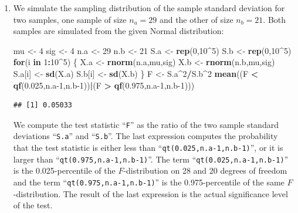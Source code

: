 \documentclass[
]{krantz}
\makeatletter
\newenvironment{Shaded}{\begin{snugshade}}{\end{snugshade}}
\newcommand{\ControlFlowTok}[1]{\textcolor[rgb]{0.13,0.29,0.53}{\textbf{#1}}}
\newcommand{\DecValTok}[1]{\textcolor[rgb]{0.00,0.00,0.81}{#1}}
\newcommand{\FloatTok}[1]{\textcolor[rgb]{0.00,0.00,0.81}{#1}}
\newcommand{\KeywordTok}[1]{\textcolor[rgb]{0.13,0.29,0.53}{\textbf{#1}}}
\newcommand{\NormalTok}[1]{#1}
\newcommand{\OperatorTok}[1]{\textcolor[rgb]{0.81,0.36,0.00}{\textbf{#1}}}
\newcommand{\StringTok}[1]{\textcolor[rgb]{0.31,0.60,0.02}{#1}}
\newenvironment{kframe}{%
\medskip{}
\setlength{\fboxsep}{.8em}
 \def\at@end@of@kframe{}%
 \ifinner\ifhmode%
  \def\at@end@of@kframe{\end{minipage}}%
  \begin{minipage}{\columnwidth}%
 \fi\fi%
 \def\FrameCommand##1{\hskip\@totalleftmargin \hskip-\fboxsep
 \colorbox{shadecolor}{##1}\hskip-\fboxsep
     \hskip-\linewidth \hskip-\@totalleftmargin \hskip\columnwidth}%
 \MakeFramed {\advance\hsize-\width
   \@totalleftmargin\z@ \linewidth\hsize
   \@setminipage}}%
 {\par\unskip\endMakeFramed%
 \at@end@of@kframe}
\renewenvironment{Shaded}{\begin{kframe}}{\end{kframe}}
\theoremstyle{definition}
\theoremstyle{definition}
\theoremstyle{definition}
\theoremstyle{remark}
\makeatother
\begin{document}
\begin{enumerate}
\def\labelenumi{\arabic{enumi}.}
\item
  We simulate the sampling distribution
  of the sample standard deviation for two samples, one sample of size
  \(n_a = 29\) and the other of size \(n_b=21\). Both samples are simulated
  from the given Normal distribution:

\begin{Shaded}
\begin{Highlighting}[]
\NormalTok{mu <-}\StringTok{ }\DecValTok{4}
\NormalTok{sig <-}\StringTok{ }\DecValTok{4}
\NormalTok{n.a <-}\StringTok{ }\DecValTok{29}
\NormalTok{n.b <-}\StringTok{ }\DecValTok{21}
\NormalTok{S.a <-}\StringTok{ }\KeywordTok{rep}\NormalTok{(}\DecValTok{0}\NormalTok{,}\DecValTok{10}\OperatorTok{^}\DecValTok{5}\NormalTok{)}
\NormalTok{S.b <-}\StringTok{ }\KeywordTok{rep}\NormalTok{(}\DecValTok{0}\NormalTok{,}\DecValTok{10}\OperatorTok{^}\DecValTok{5}\NormalTok{)}
\ControlFlowTok{for}\NormalTok{(i }\ControlFlowTok{in} \DecValTok{1}\OperatorTok{:}\DecValTok{10}\OperatorTok{^}\DecValTok{5}\NormalTok{) \{}
\NormalTok{  X.a <-}\StringTok{ }\KeywordTok{rnorm}\NormalTok{(n.a,mu,sig)}
\NormalTok{  X.b <-}\StringTok{ }\KeywordTok{rnorm}\NormalTok{(n.b,mu,sig)}
\NormalTok{  S.a[i] <-}\StringTok{ }\KeywordTok{sd}\NormalTok{(X.a)}
\NormalTok{  S.b[i] <-}\StringTok{ }\KeywordTok{sd}\NormalTok{(X.b)}
\NormalTok{\}}
\NormalTok{F <-}\StringTok{ }\NormalTok{S.a}\OperatorTok{^}\DecValTok{2}\OperatorTok{/}\NormalTok{S.b}\OperatorTok{^}\DecValTok{2}
\KeywordTok{mean}\NormalTok{((F }\OperatorTok{<}\StringTok{ }\KeywordTok{qf}\NormalTok{(}\FloatTok{0.025}\NormalTok{,n.a}\DecValTok{-1}\NormalTok{,n.b}\DecValTok{-1}\NormalTok{))}\OperatorTok{|}\NormalTok{(F }\OperatorTok{>}\StringTok{ }\KeywordTok{qf}\NormalTok{(}\FloatTok{0.975}\NormalTok{,n.a}\DecValTok{-1}\NormalTok{,n.b}\DecValTok{-1}\NormalTok{)))}
\end{Highlighting}
\end{Shaded}

\begin{verbatim}
## [1] 0.05033
\end{verbatim}

  We compute the test statistic ``\texttt{F}'' as the ratio of the two sample
  standard deviations ``\texttt{S.a}'' and ``\texttt{S.b}''. The last expression computes
  the probability that the test statistic is either less than
  ``\texttt{qt(0.025,n.a-1,n.b-1)}'', or it is larger than
  ``\texttt{qt(0.975,n.a-1,n.b-1)}''. The term ``\texttt{qt(0.025,n.a-1,n.b-1)}'' is the
  0.025-percentile of the \(F\)-distribution on 28 and 20 degrees of freedom
  and the term ``\texttt{qt(0.975,n.a-1,n.b-1)}'' is the 0.975-percentile of the
  same \(F\)-distribution. The result of the last expression is the actual
  significance level of the test.


\end{enumerate}
\end{document}
